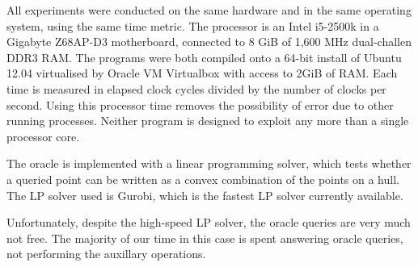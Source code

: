 All experiments were conducted on the same hardware and in the same operating system, using the same time metric. The processor is an Intel i5-2500k in a Gigabyte Z68AP-D3 motherboard, connected to 8 GiB of 1,600 MHz dual-challen DDR3 RAM. The programs were both compiled onto a 64-bit install of Ubuntu 12.04 virtualised by Oracle VM Virtualbox with access to 2GiB of RAM. Each time is measured in elapsed clock cycles divided by the number of clocks per second. Using this processor time removes the possibility of error due to other running processes. Neither program is designed to exploit any more than a single processor core.

The oracle is implemented with a linear programming solver, which tests whether a queried point can be written as a convex combination of the points on a hull. The LP solver used is Gurobi, which is the fastest LP solver currently available.


Unfortunately, despite the high-speed LP solver, the oracle queries are very much not free. The majority of our time in this case is spent answering oracle queries, not performing the auxillary operations. %
